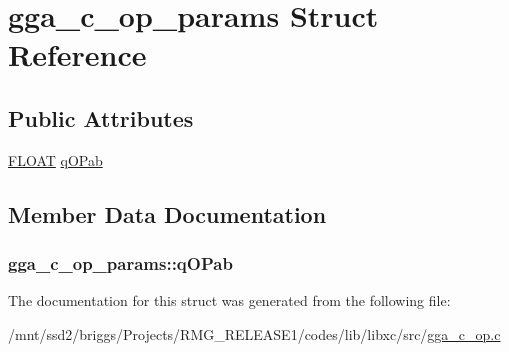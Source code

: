 \hypertarget{structgga__c__op__params}{\section{gga\-\_\-c\-\_\-op\-\_\-params Struct Reference}
\label{structgga__c__op__params}
}
\subsection*{Public Attributes}
\begin{DoxyCompactItemize}
\item 
\hyperlink{src_2xc__config_8h_ae8690abbffa85934d64d545920e2b108}{F\-L\-O\-A\-T} \hyperlink{structgga__c__op__params_a3e6adf0d07e65038d03af76704a827a8}{q\-O\-Pab}
\end{DoxyCompactItemize}


\subsection{Member Data Documentation}
\hypertarget{structgga__c__op__params_a3e6adf0d07e65038d03af76704a827a8}{
\subsubsection[{q\-O\-Pab}]{ gga\-\_\-c\-\_\-op\-\_\-params\-::q\-O\-Pab}}\label{structgga__c__op__params_a3e6adf0d07e65038d03af76704a827a8}


The documentation for this struct was generated from the following file\-:\begin{DoxyCompactItemize}
\item 
/mnt/ssd2/briggs/\-Projects/\-R\-M\-G\-\_\-\-R\-E\-L\-E\-A\-S\-E1/codes/lib/libxc/src/\hyperlink{gga__c__op_8c}{gga\-\_\-c\-\_\-op.\-c}\end{DoxyCompactItemize}
